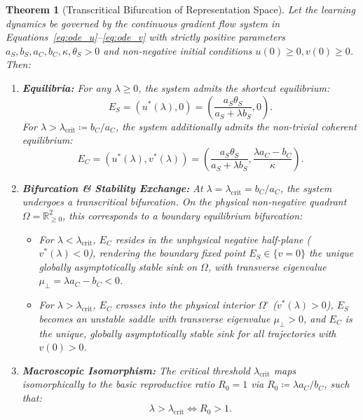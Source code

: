 \documentclass{article}
\theoremstyle{plain}
\newtheorem{theorem}{Theorem}
\theoremstyle{definition}
\begin{document}
\begin{theorem}[Transcritical Bifurcation of Representation Space]
\label{thm:transcritical_bifurcation}
Let the learning dynamics be governed by the continuous gradient flow system in Equations~\eqref{eq:ode_u}--\eqref{eq:ode_v} with strictly positive parameters $a_S, b_S, a_C, b_C, \kappa, \theta_S > 0$ and non-negative initial conditions $u(0) \ge 0, v(0) \ge 0$. Then:
\begin{enumerate}[label=(\roman*),leftmargin=*]
    \item \textbf{Equilibria:} For any $\lambda \ge 0$, the system admits the shortcut equilibrium:
    \begin{equation}
        E_S = \left( u^*(\lambda), 0 \right) = \left( \frac{a_S \theta_S}{a_S + \lambda b_S}, 0 \right).
        \label{eq:equilibrium_ES}
    \end{equation}
    For $\lambda > \lambda_{\text{crit}} \coloneqq b_C / a_C$, the system additionally admits the non-trivial coherent equilibrium:
    \begin{equation}
        E_C = \left( u^*(\lambda), v^*(\lambda) \right) = \left( \frac{a_S \theta_S}{a_S + \lambda b_S}, \frac{\lambda a_C - b_C}{\kappa} \right).
        \label{eq:equilibrium_EC}
    \end{equation}
    \item \textbf{Bifurcation \& Stability Exchange:} At $\lambda = \lambda_{\text{crit}} = b_C / a_C$, the system undergoes a transcritical bifurcation. On the physical non-negative quadrant $\Omega = \mathbb{R}_{\ge 0}^2$, this corresponds to a boundary equilibrium bifurcation:
    \begin{itemize}[noitemsep]
        \item For $\lambda < \lambda_{\text{crit}}$, $E_C$ resides in the unphysical negative half-plane ($v^*(\lambda) < 0$), rendering the boundary fixed point $E_S \in \{v=0\}$ the unique globally asymptotically stable sink on $\Omega$, with transverse eigenvalue $\mu_{\perp} = \lambda a_C - b_C < 0$.
        \item For $\lambda > \lambda_{\text{crit}}$, $E_C$ crosses into the physical interior $\Omega^\circ$ ($v^*(\lambda) > 0$), $E_S$ becomes an unstable saddle with transverse eigenvalue $\mu_{\perp} > 0$, and $E_C$ is the unique, globally asymptotically stable sink for all trajectories with $v(0) > 0$.
    \end{itemize}
    \item \textbf{Macroscopic Isomorphism:} The critical threshold $\lambda_{\text{crit}}$ maps isomorphically to the basic reproductive ratio $R_0 = 1$ via $R_0 \coloneqq \lambda a_C / b_C$, such that:
    \begin{equation}
        \lambda > \lambda_{\text{crit}} \iff R_0 > 1.
    \end{equation}
\end{enumerate}
\end{theorem}
\end{document}
